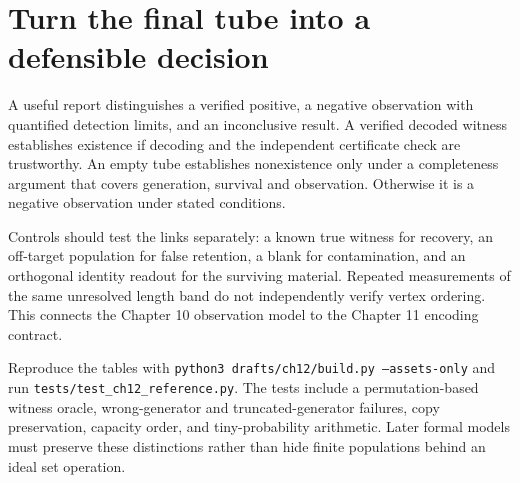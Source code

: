 \section{Turn the final tube into a defensible decision}
A useful report distinguishes a verified positive, a negative observation
with quantified detection limits, and an inconclusive result. A verified
decoded witness establishes existence if decoding and the independent
certificate check are trustworthy. An empty tube establishes nonexistence
only under a completeness argument that covers generation, survival and
observation. Otherwise it is a negative observation under stated conditions.

Controls should test the links separately: a known true witness for recovery,
an off-target population for false retention, a blank for contamination,
and an orthogonal identity readout for the surviving material. Repeated
measurements of the same unresolved length band do not independently verify
vertex ordering. This connects the Chapter 10 observation model to the
Chapter 11 encoding contract.

Reproduce the tables with \texttt{python3 drafts/ch12/build.py --assets-only}
and run \texttt{tests/test\_ch12\_reference.py}. The tests include a
permutation-based witness oracle, wrong-generator and truncated-generator
failures, copy preservation, capacity order, and tiny-probability arithmetic.
Later formal models must preserve these distinctions rather than hide finite
populations behind an ideal set operation.

